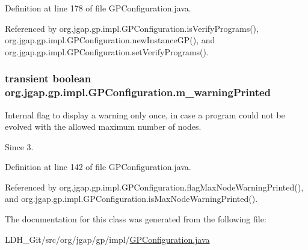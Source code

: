 Definition at line 178 of file G\-P\-Configuration.\-java.



Referenced by org.\-jgap.\-gp.\-impl.\-G\-P\-Configuration.\-is\-Verify\-Programs(), org.\-jgap.\-gp.\-impl.\-G\-P\-Configuration.\-new\-Instance\-G\-P(), and org.\-jgap.\-gp.\-impl.\-G\-P\-Configuration.\-set\-Verify\-Programs().

\hypertarget{classorg_1_1jgap_1_1gp_1_1impl_1_1_g_p_configuration_abe7a7bf74dc8eb2ad649574213d065fd}{
\subsubsection[{m\-\_\-warning\-Printed}]{\setlength{\rightskip}{0pt plus 5cm}transient boolean org.\-jgap.\-gp.\-impl.\-G\-P\-Configuration.\-m\-\_\-warning\-Printed\hspace{0.3cm}{\ttfamily [private]}}}\label{classorg_1_1jgap_1_1gp_1_1impl_1_1_g_p_configuration_abe7a7bf74dc8eb2ad649574213d065fd}
Internal flag to display a warning only once, in case a program could not be evolved with the allowed maximum number of nodes.

\begin{DoxySince}{Since}
3. 
\end{DoxySince}


Definition at line 142 of file G\-P\-Configuration.\-java.



Referenced by org.\-jgap.\-gp.\-impl.\-G\-P\-Configuration.\-flag\-Max\-Node\-Warning\-Printed(), and org.\-jgap.\-gp.\-impl.\-G\-P\-Configuration.\-is\-Max\-Node\-Warning\-Printed().



The documentation for this class was generated from the following file\-:\begin{DoxyCompactItemize}
\item 
L\-D\-H\-\_\-\-Git/src/org/jgap/gp/impl/\hyperlink{_g_p_configuration_8java}{G\-P\-Configuration.\-java}\end{DoxyCompactItemize}
